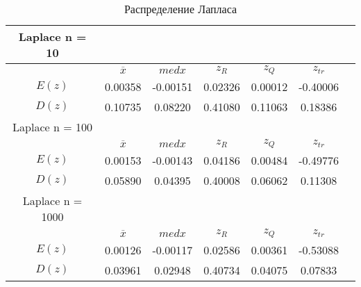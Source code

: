 \documentclass[12pt,a4paper]{scrartcl}
\begin{document}
\begin{table}[H]
  \centering
  \begin{tabular}{ | c | c | c | c | c | c | c | }
	\hline
Laplace n = 10 & & & & &  \\ \hline
         & $\overline x$& $med x$& $z_R $ & $z_Q $  &  $z_{tr}$  \\ \hline
         $E(z)$ & 0.00358 & -0.00151 & 0.02326 & 0.00012 & -0.40006 \\ \hline
         $D(z)$ & 0.10735 & 0.08220 & 0.41080 & 0.11063 & 0.18386 \\ \hline

Laplace n = 100 & & & & &  \\ \hline
         & $\overline x$& $med x$& $z_R $ & $z_Q $  &  $z_{tr}$  \\ \hline
         $E(z)$ & 0.00153 & -0.00143 & 0.04186 & 0.00484 & -0.49776 \\ \hline
         $D(z)$ & 0.05890 & 0.04395 & 0.40008 & 0.06062 & 0.11308 \\ \hline

Laplace n = 1000 & & & & &  \\ \hline
         & $\overline x$& $med x$& $z_R $ & $z_Q $  &  $z_{tr}$  \\ \hline
         $E(z)$ & 0.00126 & -0.00117 & 0.02586 & 0.00361 & -0.53088 \\ \hline
         $D(z)$ & 0.03961 & 0.02948 & 0.40734 & 0.04075 & 0.07833 \\ \hline
	\end{tabular}
  \label{table:laplace_table}
\caption{Распределение Лапласа}
\end{table}
\end{document}
